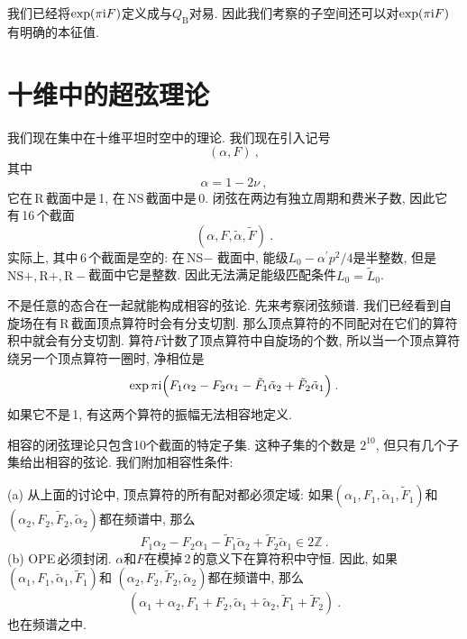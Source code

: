我们已经将$ \exp(\pi\mathrm{i} F) $定义成与$ Q_{\text{B}} $对易. 因此我们考察的子空间还可以对$ \exp(\pi\mathrm{i} F) $有明确的本征值.

\section{十维中的超弦理论}

我们现在集中在十维平坦时空中的理论. 我们现在引入记号
\begin{equation}
    (\alpha, F) \:, \label{10.6.1}
\end{equation}
其中
\begin{equation}
    \alpha = 1 - 2\nu \:, \label{10.6.2}
\end{equation}
它在\,R\,截面中是\,1, 在\,NS\,截面中是\,0. 闭弦在两边有独立周期和费米子数, 因此它有\,16\,个截面
\begin{equation}
    (\alpha, F,\tilde{\alpha},\tilde{F})\:. \label{10.6.3}
\end{equation}
实际上, 其中\,6\,个截面是空的: 在\,NS$-$ 截面中, 能级$ L_{0}-\alpha^{\prime}p^{2}/4 $是半整数, 但是$ \text{NS}+,\text{R}+,\text{R}-$截面中它是整数. 因此无法满足能级匹配条件$ L_{0}=\tilde{L}_{0}$.

不是任意的态合在一起就能构成相容的弦论. 先来考察闭弦频谱. 我们已经看到自旋场在有\,R\,截面顶点算符时会有分支切割. 那么顶点算符的不同配对在它们的算符积中就会有分支切割. 算符$ F $计数了顶点算符中自旋场的个数, 所以当一个顶点算符绕另一个顶点算符一圈时, 净相位是
\begin{equation}
    \exp \pi\mathrm{i}\Bigl(F_{1}\alpha_{2} - F_{2}\alpha_{1} - \tilde{F}_{1}\tilde{\alpha}_{2} +\tilde{F}_{2}\tilde{\alpha}_{1} \Bigr) \:. \label{10.6.4}
\end{equation}
如果它不是\,1, 有这两个算符的振幅无法相容地定义.

相容的闭弦理论只包含10个截面的特定子集. 这种子集的个数是 $2^{10}$, 但只有几个子集给出相容的弦论. 我们附加相容性条件:

\noindent (a) 从上面的讨论中, 顶点算符的所有配对都必须定域: 如果$(\alpha_{1},F_{1},\tilde{\alpha}_{1},\tilde{F}_{1})$和
$(\alpha_{2},F_{2},\tilde{F}_{2},\tilde{\alpha}_{2})$都在频谱中, 那么
\begin{equation}
    F_{1}\alpha_{2} - F_{2}\alpha_{1} -\tilde{F}_{1}\tilde{\alpha}_{2} +\tilde{F}_{2}\tilde{\alpha}_{1}\in 2\mathds{Z}\:.\label{10.6.5}
\end{equation}
\noindent (b) OPE\,必须封闭. $\alpha $和$ F $在模掉\,2\,的意义下在算符积中守恒. 因此, 如果$(\alpha_{1},F_{1},\tilde{\alpha}_{1},\tilde{F}_{1})$和
$(\alpha_{2},F_{2},\tilde{F}_{2},\tilde{\alpha}_{2})$都在频谱中, 那么
\begin{equation}
    (\alpha_{1}+\alpha_{2},F_{1}+F_{2},\tilde{\alpha}_{1}+\tilde{\alpha}_{2},\tilde{F}_{1}+\tilde{F}_{2}) \:.\label{10.6.6}
\end{equation}
也在频谱之中.


